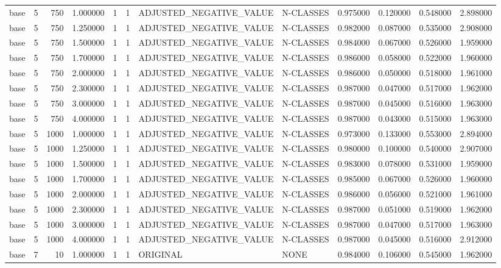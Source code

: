 \begin{tabular}{lrrrllllrrrr}
base & 5 & 750 & 1.000000 & 1 & 1 & ADJUSTED_NEGATIVE_VALUE & N-CLASSES & 0.975000 & 0.120000 & 0.548000 & 2.898000 \\
base & 5 & 750 & 1.250000 & 1 & 1 & ADJUSTED_NEGATIVE_VALUE & N-CLASSES & 0.982000 & 0.087000 & 0.535000 & 2.908000 \\
base & 5 & 750 & 1.500000 & 1 & 1 & ADJUSTED_NEGATIVE_VALUE & N-CLASSES & 0.984000 & 0.067000 & 0.526000 & 1.959000 \\
base & 5 & 750 & 1.700000 & 1 & 1 & ADJUSTED_NEGATIVE_VALUE & N-CLASSES & 0.986000 & 0.058000 & 0.522000 & 1.960000 \\
base & 5 & 750 & 2.000000 & 1 & 1 & ADJUSTED_NEGATIVE_VALUE & N-CLASSES & 0.986000 & 0.050000 & 0.518000 & 1.961000 \\
base & 5 & 750 & 2.300000 & 1 & 1 & ADJUSTED_NEGATIVE_VALUE & N-CLASSES & 0.987000 & 0.047000 & 0.517000 & 1.962000 \\
base & 5 & 750 & 3.000000 & 1 & 1 & ADJUSTED_NEGATIVE_VALUE & N-CLASSES & 0.987000 & 0.045000 & 0.516000 & 1.963000 \\
base & 5 & 750 & 4.000000 & 1 & 1 & ADJUSTED_NEGATIVE_VALUE & N-CLASSES & 0.987000 & 0.043000 & 0.515000 & 1.963000 \\
base & 5 & 1000 & 1.000000 & 1 & 1 & ADJUSTED_NEGATIVE_VALUE & N-CLASSES & 0.973000 & 0.133000 & 0.553000 & 2.894000 \\
base & 5 & 1000 & 1.250000 & 1 & 1 & ADJUSTED_NEGATIVE_VALUE & N-CLASSES & 0.980000 & 0.100000 & 0.540000 & 2.907000 \\
base & 5 & 1000 & 1.500000 & 1 & 1 & ADJUSTED_NEGATIVE_VALUE & N-CLASSES & 0.983000 & 0.078000 & 0.531000 & 1.959000 \\
base & 5 & 1000 & 1.700000 & 1 & 1 & ADJUSTED_NEGATIVE_VALUE & N-CLASSES & 0.985000 & 0.067000 & 0.526000 & 1.960000 \\
base & 5 & 1000 & 2.000000 & 1 & 1 & ADJUSTED_NEGATIVE_VALUE & N-CLASSES & 0.986000 & 0.056000 & 0.521000 & 1.961000 \\
base & 5 & 1000 & 2.300000 & 1 & 1 & ADJUSTED_NEGATIVE_VALUE & N-CLASSES & 0.987000 & 0.051000 & 0.519000 & 1.962000 \\
base & 5 & 1000 & 3.000000 & 1 & 1 & ADJUSTED_NEGATIVE_VALUE & N-CLASSES & 0.987000 & 0.047000 & 0.517000 & 1.963000 \\
base & 5 & 1000 & 4.000000 & 1 & 1 & ADJUSTED_NEGATIVE_VALUE & N-CLASSES & 0.987000 & 0.045000 & 0.516000 & 2.912000 \\
base & 7 & 10 & 1.000000 & 1 & 1 & ORIGINAL & NONE & 0.984000 & 0.106000 & 0.545000 & 1.962000 \\

\end{tabular}
